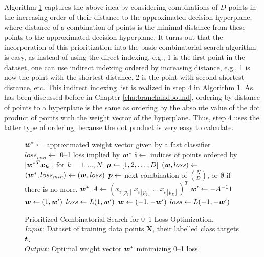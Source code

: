Algorithm \ref{alg:cs.prioritized} captures the above idea by
considering combinations of $D$ points in the increasing order of
their distance to the approximated decision hyperplane, where distance
of a combination of points is the minimal distance from these points
to the approximated decision hyperplane. It turns out that the
incorporation of this prioritization into the basic combinatorial
search algorithm is easy, as instead of using the direct indexing,
e.g., 1 is the first point in the dataset, one can use indirect
indexing ordered by increasing distance, e.g., 1 is now the point with
the shortest distance, 2 is the point with second shortest distance,
etc. This indirect indexing list is realized in step 4 in Algorithm
\ref{alg:cs.prioritized}. As has been discussed before in Chapter
\ref{cha:branchandbound}, ordering by distance of points to a
hyperplane is the same as ordering by the absolute value of the dot
product of points with the weight vector of the hyperplane. Thus, step
4 uses the latter type of ordering, because the dot product is very
easy to calculate.

\begin{figure}
\caption{
Prioritized Combinatorial Search for 0--1 Loss Optimization. \\
\text{\hspace{2.1cm}} $Input$: Dataset of training data points $ \boldsymbol{X}$, their labelled class targets $\boldsymbol{t}$. \\
\text{\hspace{2.1cm}} $Output$: Optimal weight vector $\boldsymbol{w}^*$ minimizing 0--1 loss.
}
\label{alg:cs.prioritized}
\begin{algorithmic}[1]
 
\State $\boldsymbol{w}^* \gets$ approximated weight vector given by a fast classifier
\State $loss_{min} \gets$ 0--1 loss implied by $\boldsymbol{w}^*$
\State $\boldsymbol{i} \gets$ indices of points ordered by $|{\boldsymbol{w}^*}^T\boldsymbol{x_k}|$, for $k=1, \dots, N$.
\State $\boldsymbol{p} \gets [1,2,\dots,D]$
\While{$\p \not= \emptyset$}
   \State $(\boldsymbol{w},loss) \gets$ 
      \State $(\boldsymbol{w}^*, loss_{min}) \gets (\boldsymbol{w}, loss)$
   \EndIf
   \State $\boldsymbol{p} \gets $ next combination of ${N \choose D}$, or $\emptyset$ if there is no more.
\EndWhile
\State \Return $\boldsymbol{w}^*$
\Statex
{} 
   \State $A \gets (x_{i[p_1]} \, x_{i[p_2]} \, \dots \, x_{i[p_D]})^T$
   \State $\boldsymbol{w}' \gets -A^{-1} \boldsymbol{1}$
      \State $\boldsymbol{w} \gets (1, \boldsymbol{w}')$
      \State $loss \gets L(1,\boldsymbol{w}')$
   \Else
      \State $\boldsymbol{w} \gets (-1, -\boldsymbol{w}')$
      \State $loss \gets L(-1,-\boldsymbol{w}')$
   \EndIf
   \State {}
\EndFunction
\Statex
\EndFunction
\end{algorithmic}
\end{figure}

